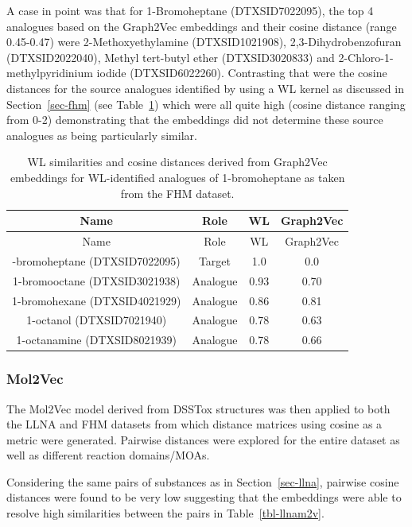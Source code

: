 \documentclass[
  super,
  preprint,
  3p]{elsarticle}
\begin{document}
A case in point was that for 1-Bromoheptane (DTXSID7022095), the top 4
analogues based on the Graph2Vec embeddings and their cosine distance
(range 0.45-0.47) were 2-Methoxyethylamine (DTXSID1021908),
2,3-Dihydrobenzofuran (DTXSID2022040), Methyl tert-butyl ether
(DTXSID3020833) and 2-Chloro-1-methylpyridinium iodide (DTXSID6022260).
Contrasting that were the cosine distances for the source analogues
identified by using a WL kernel as discussed in Section~\ref{sec-fhm}
(see Table~\ref{tbl-fhm-g2v}) which were all quite high (cosine distance
ranging from 0-2) demonstrating that the embeddings did not determine
these source analogues as being particularly similar.

\begin{longtable}[]{@{}cccc@{}}
\caption{WL similarities and cosine distances derived from Graph2Vec
embeddings for WL-identified analogues of 1-bromoheptane as taken from
the FHM dataset.}\label{tbl-fhm-g2v}\tabularnewline
\toprule\noalign{}
Name & Role & WL & Graph2Vec \\
\midrule\noalign{}
\endfirsthead
\toprule\noalign{}
Name & Role & WL & Graph2Vec \\
\midrule\noalign{}
\endhead
\bottomrule\noalign{}
\endlastfoot
1-bromoheptane (DTXSID7022095) & Target & 1.0 & 0.0 \\
1-bromooctane (DTXSID3021938) & Analogue & 0.93 & 0.70 \\
1-bromohexane (DTXSID4021929) & Analogue & 0.86 & 0.81 \\
1-octanol (DTXSID7021940) & Analogue & 0.78 & 0.63 \\
1-octanamine (DTXSID8021939) & Analogue & 0.78 & 0.66 \\
\end{longtable}

\subsubsection{Mol2Vec}\label{mol2vec}

The Mol2Vec model derived from DSSTox structures was then applied to
both the LLNA and FHM datasets from which distance matrices using cosine
as a metric were generated. Pairwise distances were explored for the
entire dataset as well as different reaction domains/MOAs.

Considering the same pairs of substances as in Section~\ref{sec-llna},
pairwise cosine distances were found to be very low suggesting that the
embeddings were able to resolve high similarities between the pairs in
Table~\ref{tbl-llnam2v}.
\end{document}
